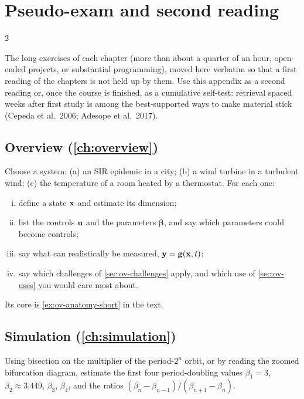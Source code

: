 \chapter{Pseudo-exam and second reading}\label{app:exam}
\begin{paracol}{2}

The long exercises of each chapter (more than about a quarter of an hour, open-ended projects, or substantial
programming), moved here verbatim so that a first reading of the chapters is not held up by them. Use this
appendix as a second reading or, once the course is finished, as a cumulative self-test: retrieval spaced weeks
after first study is among the best-supported ways to make material stick (Cepeda et al.\ 2006; Adesope et al.\ 2017).

\section{Overview (\cref{ch:overview})}\label{exam:ch01}

\begin{exercise}\label{ex:ov-anatomy}
Choose a system: (a) an SIR epidemic in a city; (b) a wind turbine in a turbulent wind; (c) the
temperature of a room heated by a thermostat. For each one:
\begin{enumerate}[(i)]
  \item define a state $\mathbf{x}$ and estimate its dimension;
  \item list the controls $\mathbf{u}$ and the parameters $\boldsymbol\beta$, and say which parameters
        could become controls;
  \item say what can realistically be measured, $\mathbf{y}=\mathbf{g}(\mathbf{x},t)$;
  \item say which challenges of \cref{sec:ov-challenges} apply, and which use of
        \cref{sec:ov-uses} you would care most about.
\end{enumerate}
Its core is \cref{ex:ov-anatomy-short} in the text.
\end{exercise}

\section{Simulation (\cref{ch:simulation})}\label{exam:ch03}

\begin{exercise}\label{ch03:exam-1}
Using bisection on the multiplier of the period-$2^n$ orbit, or by reading the zoomed bifurcation
diagram, estimate the first four period-doubling values $\beta_1=3$, $\beta_2\approx3.449$, $\beta_3$,
$\beta_4$, and the ratios $(\beta_n-\beta_{n-1})/(\beta_{n+1}-\beta_n)$.
\end{exercise}


\end{paracol}
